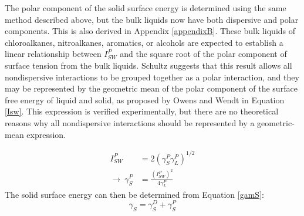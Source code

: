 
The polar component of the solid surface energy is determined using the same method described above,\cite{Schultz1977} but the bulk liquids now have both dispersive and polar components. This is also derived in Appendix \ref{appendixB}. These bulk liquids of chloroalkanes, nitroalkanes, aromatics, or alcohols are expected to establish a linear relationship between $I_{SW}^{P} $ and the square root of the polar component of surface tension from the bulk liquids. Schultz \etal suggests that this result allows all nondispersive interactions to be grouped together as a polar interaction, and they may be represented by the geometric mean of the polar component of the surface free energy of liquid and solid, as proposed by Owens and Wendt in Equation \ref{Isw}. This expression is verified experimentally, but there are no theoretical reasons why all nondispersive interactions should be represented by a geometric-mean expression.\cite{Fowkes1964}

\begin{equation}
\label{Isw}
	\begin{split}
	I_{SW}^{P} 							& = 2 (\gamma_{S}^{P}\gamma_{L}^{P})^{1/2} \\
	\rightarrow ~ \gamma_{S}^{P}	& = \frac{(I_{SW}^{P})^{2} }{4\gamma_{L}^{P}} 
	\end{split}
\end{equation}
The solid surface energy can then be determined from Equation \ref{gamS}:
\begin{equation}
\label{gamS}	\gamma_{S} = \gamma_{S}^{D} + \gamma_{S}^{P}	
\end{equation}

